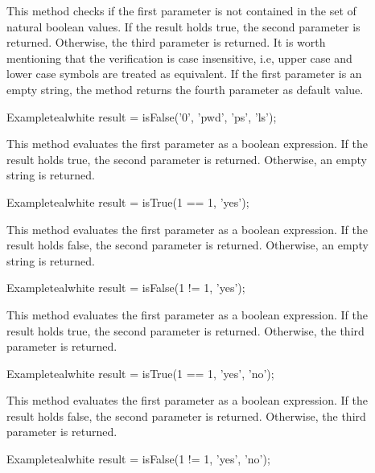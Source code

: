 \begin{description}
\item[] This method checks if the first parameter is not contained in the set of natural boolean values. If the result holds true, the second parameter is returned. Otherwise, the third parameter is returned. It is worth mentioning that the verification is case insensitive, i.e, upper case and lower case symbols are treated as equivalent. If the first parameter is an empty string, the method returns the fourth parameter as default value.

\begin{codebox}{Example}{teal}{\icnote}{white}
result = isFalse('0', 'pwd', 'ps', 'ls');
\end{codebox}

\item[] This method evaluates the first parameter as a boolean expression. If the result holds true, the second parameter is returned. Otherwise, an empty string is returned.

\begin{codebox}{Example}{teal}{\icnote}{white}
result = isTrue(1 == 1, 'yes');
\end{codebox}

\item[] This method evaluates the first parameter as a boolean expression. If the result holds false, the second parameter is returned. Otherwise, an empty string is returned.

\begin{codebox}{Example}{teal}{\icnote}{white}
result = isFalse(1 != 1, 'yes');
\end{codebox}

\item[] This method evaluates the first parameter as a boolean expression. If the result holds true, the second parameter is returned. Otherwise, the third parameter is returned.

\begin{codebox}{Example}{teal}{\icnote}{white}
result = isTrue(1 == 1, 'yes', 'no');
\end{codebox}

\item[] This method evaluates the first parameter as a boolean expression. If the result holds false, the second parameter is returned. Otherwise, the third parameter is returned.

\begin{codebox}{Example}{teal}{\icnote}{white}
result = isFalse(1 != 1, 'yes', 'no');
\end{codebox}
\end{description}

